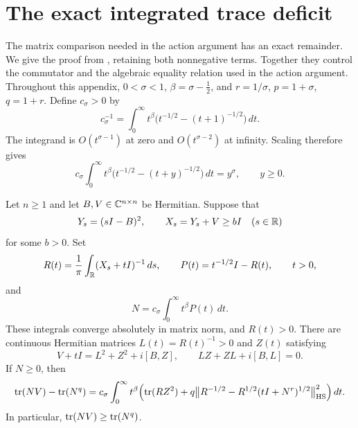 \section{The exact integrated trace deficit}\label{app:trace}

The matrix comparison needed in the action argument has an exact
remainder.  We give the proof from \cite[Section~3]{MLT}, retaining
both nonnegative terms.  Together they control the commutator and
the algebraic equality relation used in the action argument.
Throughout this appendix, $0<\sigma<1$, $\beta=\sigma-\tfrac12$, and
$r=1/\sigma$, $p=1+\sigma$, $q=1+r$.
Define $c_\sigma>0$ by
\begin{equation}\label{trace:normalization}
 c_\sigma^{-1}
 =\int_0^\infty t^\beta
       \bigl(t^{-1/2}-(t+1)^{-1/2}\bigr)\,dt.
\end{equation}
The integrand is $O(t^{\sigma-1})$ at zero and
$O(t^{\sigma-2})$ at infinity.  Scaling therefore gives
\begin{equation}\label{trace:scaling}
 c_\sigma\int_0^\infty t^\beta
       \bigl(t^{-1/2}-(t+y)^{-1/2}\bigr)\,dt=y^\sigma,
 \qquad y\geq0.
\end{equation}

\begin{theorem}\label{trace:deficit}
Let $n\geq1$ and let $B,V\in\mathbb C^{n\times n}$ be Hermitian.
Suppose that
\begin{equation}\label{trace:symbol}
 Y_s=(sI-B)^2,\qquad X_s=Y_s+V\geq bI
 \quad(s\in\mathbb R)
\end{equation}
for some $b>0$.  Set
\begin{equation}\label{trace:resolvents}
 R(t)=\frac1\pi\int_\mathbb R(X_s+tI)^{-1}\,ds,
 \qquad P(t)=t^{-1/2}I-R(t),\qquad t>0,
\end{equation}
and
\begin{equation}\label{trace:N}
 N=c_\sigma\int_0^\infty t^\beta P(t)\,dt.
\end{equation}
These integrals converge absolutely in matrix norm, and $R(t)>0$.
There are continuous Hermitian matrices $L(t)=R(t)^{-1}>0$ and
$Z(t)$ satisfying
\begin{equation}\label{trace:LZ}
 V+tI=L^2+Z^2+i[B,Z],\qquad
 LZ+ZL+i[B,L]=0.
\end{equation}
If $N\geq0$, then
\begin{equation}\label{trace:deficit-identity}
 \begin{split}
 \operatorname{tr}(NV)-\operatorname{tr}(N^q)
 =c_\sigma\int_0^\infty t^\beta\Bigl(
    \operatorname{tr}(RZ^2)
    +q\bigl\|R^{-1/2}-R^{1/2}(tI+N^r)^{1/2}\bigr\|_{\mathrm{HS}}^2
    \Bigr)\,dt.
 \end{split}
\end{equation}
In particular, $\operatorname{tr}(NV)\geq\operatorname{tr}(N^q)$.
\end{theorem}

